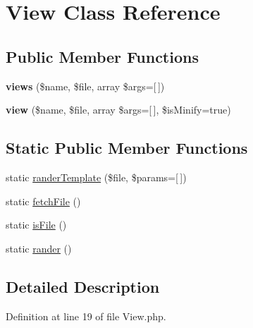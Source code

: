 \hypertarget{class_zest_1_1_component_1_1_view_1_1_view}{}\section{View Class Reference}
\label{class_zest_1_1_component_1_1_view_1_1_view}
\subsection*{Public Member Functions}
\begin{DoxyCompactItemize}
\item 
\mbox{\label{class_zest_1_1_component_1_1_view_1_1_view_a24cf0bcddd2794f031f7aad019fed5e2}} 
{\bfseries views} (\$name, \$file, array \$args=\mbox{[}$\,$\mbox{]})
\item 
\mbox{\label{class_zest_1_1_component_1_1_view_1_1_view_ac3e1df71b1948d4cf4229e90a282f4d1}} 
{\bfseries view} (\$name, \$file, array \$args=\mbox{[}$\,$\mbox{]}, \$is\+Minify=true)
\end{DoxyCompactItemize}
\subsection*{Static Public Member Functions}
\begin{DoxyCompactItemize}
\item 
static \mbox{\hyperlink{class_zest_1_1_component_1_1_view_1_1_view_a9f3e0779913ae33f6f67726498e37815}{rander\+Template}} (\$file, \$params=\mbox{[}$\,$\mbox{]})
\item 
static \mbox{\hyperlink{class_zest_1_1_component_1_1_view_1_1_view_a44206629591bb658ad32d1f86c023526}{fetch\+File}} ()
\item 
static \mbox{\hyperlink{class_zest_1_1_component_1_1_view_1_1_view_a5114b9fecb007e9aa08c1d1669ecccac}{is\+File}} ()
\item 
static \mbox{\hyperlink{class_zest_1_1_component_1_1_view_1_1_view_a169b39f53b8d8e35bd0c099da257322e}{rander}} ()
\end{DoxyCompactItemize}


\subsection{Detailed Description}


Definition at line 19 of file View.\+php.



